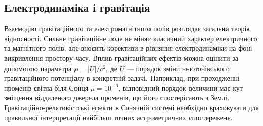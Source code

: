\subsection*{Електродинаміка і гравітація}

Взаємодію гравітаційного та електромагнітного полів розглядає загальна
теорія відносності. Сильне гравітаційне поле не міняє класичний характер
електричного та магнітного полів, але вносить корективи в рівняння
електродинаміки на фоні викривлення простору-часу. Вплив гравітаційних
ефектів можна оцінити за допомогою параметра $\mu = |U|/c^2$, де $U$ --- порядок
зміни ньютонівського гравітаційного потенціалу в конкретній задачі.
Наприклад, при проходженні променів світла біля Сонця $\mu = 10^{-6}$, відповідний
порядок величини має кут зміщення віддаленого джерела променів, що його
спостерігають з Землі. Гравітаційно-релятивістські ефекти в Сонячній системі
необхідно враховувати для правильної інтерпретації найбільш точних
астрометричних спостережень.

